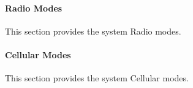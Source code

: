 \paragraph{Radio Modes}
\label{loc:LightRadioModes}

This section provides the system Radio modes.



%
%
%

%

%


\paragraph{Cellular Modes}
\label{loc:LightCellModes}

This section provides the system Cellular modes.


